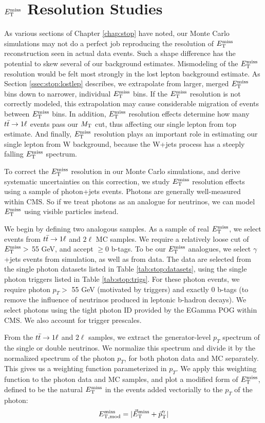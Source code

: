 \chapter{\texorpdfstring{$E_\text{T}^\text{miss}$}{MET} Resolution Studies}
\label{apx:stop:metres}

As various sections of Chapter \ref{chap:stop} have noted, our Monte
Carlo simulations may not do a perfect job reproducing the resolution
of $E_\text{T}^\text{miss}$ reconstruction seen in actual data events. Such a shape difference has
the potential to skew several of our background estimates.
Mismodeling of the $E_\text{T}^\text{miss}$ resolution would be felt most strongly in
the lost lepton background estimate. As Section
\ref{ssec:stop:lostlep} describes, we
extrapolate from larger, merged $E_\text{T}^\text{miss}$ bins down to narrower,
individual $E_\text{T}^\text{miss}$ bins. If the $E_\text{T}^\text{miss}$ resolution is not correctly modeled,
this extrapolation may cause considerable migration of events between
$E_\text{T}^\text{miss}$ bins. In addition, $E_\text{T}^\text{miss}$ resolution effects determine how many
$t\bar{t} \rightarrow 1\ell$ events pass our $M_\text{T}$ cut, thus affecting our single
lepton from top estimate. And finally, $E_\text{T}^\text{miss}$ resolution plays an
important role in estimating our single lepton from W background,
because the W+jets process has a steeply falling $E_\text{T}^\text{miss}$ spectrum.

To correct the $E_\text{T}^\text{miss}$ resolution in our Monte Carlo simulations, and
derive systematic uncertainties on this correction, we study $E_\text{T}^\text{miss}$
resolution effects using a sample of photon+jets events. Photons are
generally well-measured within CMS. So if we treat photons as an
analogue for neutrinos, we can model $E_\text{T}^\text{miss}$ using visible particles
instead.

We begin by defining two analogous samples. As a sample of real
$E_\text{T}^\text{miss}$, we select events from $t\bar{t} \rightarrow 1\ell$ and $2\ell$ MC samples. We
require a relatively loose cut of $E_\text{T}^\text{miss} >$ 55 GeV, and accept $\geq$0
b-tags. To be our $E_\text{T}^\text{miss}$ analogues, we select $\gamma$+jets events
from simulation, as well as from data. The data are selected
from the single photon datasets listed in Table
\ref{tab:stop:datasets}, using the single photon triggers listed in
Table \ref{tab:stop:trigs}. For these photon events, we require photon $p_T
>$ 55 GeV (motivated by triggers) and exactly 0 b-tags (to remove the
influence of neutrinos produced in leptonic b-hadron decays). We
select photons using the tight photon ID provided by the EGamma POG
within CMS. We also account for trigger prescales.

From the $t\bar{t} \rightarrow 1\ell$ and $2\ell$ samples, we extract the
generator-level $p_T$ spectrum of the single or double neutrinos. We
normalize this spectrum and divide it by the normalized spectrum of
the photon $p_T$, for both photon data and MC separately. This gives
us a weighting function parameterized in $p_T$. We apply this
weighting function to the photon data and MC samples, and plot
a modified form of $E_\text{T}^\text{miss}$, defined to be the natural $E_\text{T}^\text{miss}$ in the
events added vectorially to the $p_T$ of the photon:
\begin{equation}
E_\text{T,mod}^\text{miss} = |\vec{E}_\text{T}^\text{miss} + \vec{p}_\text{T}^\gamma|
\end{equation}

